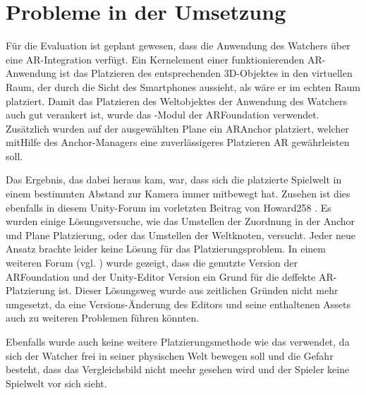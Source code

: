 \section{Probleme in der Umsetzung}
Für die Evaluation ist geplant gewesen, dass die Anwendung des Watchers über eine \ac{AR}-Integration verfügt. Ein Kernelement einer funktionierenden \ac{AR}-Anwendung ist das Platzieren des entsprechenden \ac{3D}-Objektes in den virtuellen Raum, der durch die Sicht des Smartphones aussieht, als wäre er im echten Raum platziert. Damit das Platzieren des Weltobjektes der Anwendung des Watchers auch gut verankert ist, wurde das -Modul der \ac{AR}Foundation verwendet. Zusätzlich wurden auf der ausgewählten Plane ein \ac{AR}Anchor platziert, welcher mitHilfe des Anchor-Managers eine zuverlässigeres Platzieren \ac{AR} gewährleisten soll.

Das Ergebnis, das dabei heraus kam, war, dass sich die platzierte Spielwelt in einem bestimmten Abstand zur Kamera immer mitbewegt hat. Zusehen ist dies ebenfalls in diesem Unity-Forum im vorletzten Beitrag von Howard258 \cite{noauthor_unity_2025}. Es wurden einige Lösungsversuche, wie das Umstellen der Zuordnung in der Anchor und Plane Platzierung, oder das Umstellen der Weltknoten, versucht. Jeder neue Ansatz brachte leider keine Lösung für das Platzierungsproblem. In einem weiteren Forum (vgl. \cite{noauthor_ar_2023}) wurde gezeigt, dass die genutzte Version der \ac{AR}Foundation und der Unity-Editor Version ein Grund für die deffekte \ac{AR}-Platzierung ist. Dieser Lösungsweg wurde aus zeitlichen Gründen nicht mehr umgesetzt, da eine Versions-Änderung des Editors und seine enthaltenen Assets auch zu weiteren Problemen führen könnten. 

Ebenfalls wurde auch keine weitere Platzierungsmethode wie das  verwendet, da sich der Watcher frei in seiner physischen Welt bewegen soll und die Gefahr besteht, dass das Vergleichsbild nicht meehr gesehen wird und der Spieler keine Spielwelt vor sich sieht.

